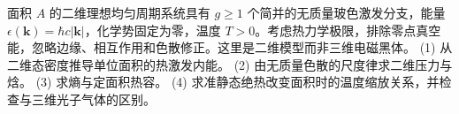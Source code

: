 面积 \(A\) 的二维理想均匀周期系统具有 \(g\ge1\) 个简并的无质量玻色激发分支，能量 \(\epsilon(\boldsymbol k)=\hbar c|\boldsymbol k|\)，化学势固定为零，温度 \(T>0\)。考虑热力学极限，排除零点真空能，忽略边缘、相互作用和色散修正。这里是二维模型而非三维电磁黑体。
(1) 从二维态密度推导单位面积的热激发内能。
(2) 由无质量色散的尺度律求二维压力与焓。
(3) 求熵与定面积热容。
(4) 求准静态绝热改变面积时的温度缩放关系，并检查与三维光子气体的区别。
